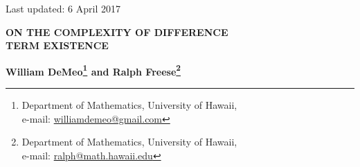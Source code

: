 \begin{flushright}
\vspace*{-1.1cm} {{\small \sffamily Last updated: 6 April 2017}}
\end{flushright}
\vspace{0.8cm}
\begin{center}
{\large \bf ON THE COMPLEXITY OF DIFFERENCE\\ TERM EXISTENCE
} \vspace*{3mm}


{\bf William DeMeo\footnote{Department of Mathematics, University of Hawaii,\\
    e-mail: \href{mailto:williamdemeo@gmail.com}{williamdemeo@gmail.com}}
and Ralph Freese\footnote{Department of Mathematics, University of Hawaii,\\
    e-mail: \href{mailto:ralph@math.hawaii.edu}{ralph@math.hawaii.edu}}}
\end{center}

\begin{abstract}
We consider the following practical question: given a finite algebra $\bA$ in a
finite language, can we efficiently decide whether the variety generated by
$\bA$ has a difference term?  We define %
``local difference terms'' and used to solve 
a related but easier problem---namely, we show that
there is a polynomial-time algorithm for deciding whether any finite idempotent
algebra has a difference term operation. 
Thereafter, we define ``global-local difference terms'' which we use to 
make some progress toward an efficient algorithm for deciding whether the
variety generated by a finite idempotent algebra has a difference term.
\\[2mm] {\it AMS Mathematics  Subject Classification $(2000)$}: 08B05, 08B10, 68Q25
\\[1mm] {\it Key words:} difference term, idempotent algebra, commutator

\end{abstract}

